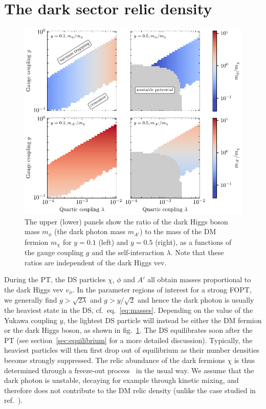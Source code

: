 \section{The dark sector relic density}
\label{sec:relic}

\begin{figure}[t!]
	\centering
	\includegraphics[width=\textwidth]{thesisplots/lisa/thesis_LISA_4}
	\caption{
		The upper (lower) panels show the ratio of the dark Higgs boson mass $m_\phi$ (the dark photon mass $m_{A'}$) to the mass of the DM fermion $m_\chi$ for $y = 0.1$ (left) and $y = 0.5$ (right), as a functions of the gauge coupling $g$ and the self-interaction $\lambda$. Note that these ratios are independent of the dark Higgs \ac{vev}.}
	\label{fig:mass_ratios}
\end{figure}

During the \ac{PT}, the \ac{DS} particles $\chi$, $\phi$ and $A'$ all obtain masses proportional to the dark Higgs \ac{vev} $v_{\phi}$. In the parameter regions of interest for a strong \ac{FOPT}, we generally find $g > \sqrt{2\lambda}$ and $g > y/\sqrt{2}$ and hence the dark photon is usually the heaviest state in the \ac{DS}, cf.~eq.~\eqref{eq:masses}. Depending on the value of the Yukawa coupling $y$, the lightest \ac{DS} particle will instead be either the \ac{DM} fermion or the dark Higgs boson, as shown in fig.~\ref{fig:mass_ratios}. The \ac{DS} equilibrates soon after the \ac{PT} (see section~\ref{sec:equilibrium} for a more detailed discussion). Typically, the heaviest particles will then first drop out of equilibrium as their  number densities become strongly suppressed. The relic abundance of the dark fermions $\chi$ is thus determined through a freeze-out process~\cite{Lee:1977ua} in the usual way. We assume that the dark photon is unstable, decaying for example through kinetic mixing, and therefore does not contribute to the \ac{DM} relic density (unlike the case studied in ref.~\cite{Kanemura:2023jiw}).

